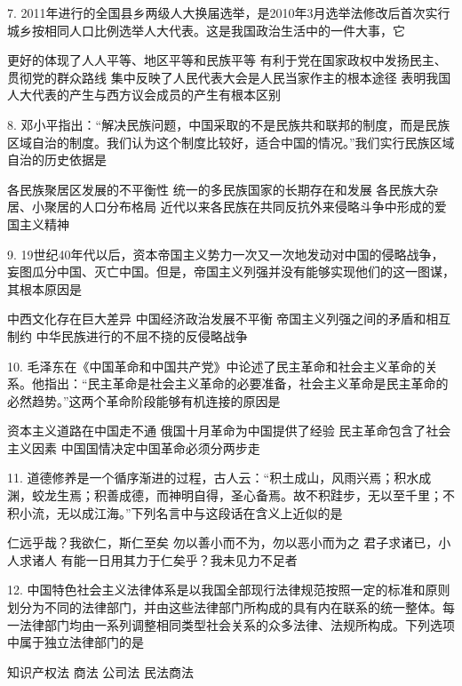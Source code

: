 7. 2011年进行的全国县乡两级人大换届选举，是2010年3月选举法修改后首次实行城乡按相同人口比例选举人大代表。这是我国政治生活中的一件大事，它
\begin{choices}
	 更好的体现了人人平等、地区平等和民族平等
	 有利于党在国家政权中发扬民主、贯彻党的群众路线
	 集中反映了人民代表大会是人民当家作主的根本途径
	 表明我国人大代表的产生与西方议会成员的产生有根本区别
\end{choices}

8. 邓小平指出：“解决民族问题，中国采取的不是民族共和联邦的制度，而是民族区域自治的制度。我们认为这个制度比较好，适合中国的情况。”我们实行民族区域自治的历史依据是
\begin{choices}
	 各民族聚居区发展的不平衡性
	 统一的多民族国家的长期存在和发展
	 各民族大杂居、小聚居的人口分布格局
	 近代以来各民族在共同反抗外来侵略斗争中形成的爱国主义精神
\end{choices}

9. 19世纪40年代以后，资本帝国主义势力一次又一次地发动对中国的侵略战争，妄图瓜分中国、灭亡中国。但是，帝国主义列强并没有能够实现他们的这一图谋，其根本原因是
\begin{choices}
	 中西文化存在巨大差异
	 中国经济政治发展不平衡
	 帝国主义列强之间的矛盾和相互制约
	 中华民族进行的不屈不挠的反侵略战争
\end{choices}

10. 毛泽东在《中国革命和中国共产党》中论述了民主革命和社会主义革命的关系。他指出：“民主革命是社会主义革命的必要准备，社会主义革命是民主革命的必然趋势。”这两个革命阶段能够有机连接的原因是
\begin{choices}
	 资本主义道路在中国走不通
	 俄国十月革命为中国提供了经验
	 民主革命包含了社会主义因素
	 中国国情决定中国革命必须分两步走
\end{choices}

11. 道德修养是一个循序渐进的过程，古人云：“积土成山，风雨兴焉；积水成渊，蛟龙生焉；积善成德，而神明自得，圣心备焉。故不积跬步，无以至千里；不积小流，无以成江海。”下列名言中与这段话在含义上近似的是
\begin{choices}
	 仁远乎哉？我欲仁，斯仁至矣
	 勿以善小而不为，勿以恶小而为之
	 君子求诸已，小人求诸人
	 有能一日用其力于仁矣乎？我未见力不足者
\end{choices}

12. 中国特色社会主义法律体系是以我国全部现行法律规范按照一定的标准和原则划分为不同的法律部门，并由这些法律部门所构成的具有内在联系的统一整体。每一法律部门均由一系列调整相同类型社会关系的众多法律、法规所构成。下列选项中属于独立法律部门的是
\begin{choices}
	 知识产权法
	 商法
	 公司法
	 民法商法
\end{choices}

